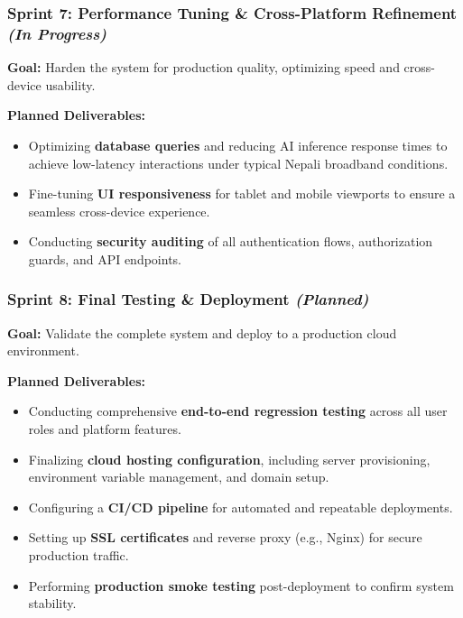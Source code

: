 \subsubsection*{Sprint 7: Performance Tuning \& Cross-Platform Refinement \hfill \textit{(In Progress)}}

\textbf{Goal:} Harden the system for production quality, optimizing speed and cross-device usability.

\textbf{Planned Deliverables:}
\begin{itemize}
    \item Optimizing \textbf{database queries} and reducing AI inference response times to achieve low-latency interactions under typical Nepali broadband conditions.
    \item Fine-tuning \textbf{UI responsiveness} for tablet and mobile viewports to ensure a seamless cross-device experience.
    \item Conducting \textbf{security auditing} of all authentication flows, authorization guards, and API endpoints.
\end{itemize}

\subsubsection*{Sprint 8: Final Testing \& Deployment \hfill \textit{(Planned)}}

\textbf{Goal:} Validate the complete system and deploy to a production cloud environment.

\textbf{Planned Deliverables:}
\begin{itemize}
    \item Conducting comprehensive \textbf{end-to-end regression testing} across all user roles and platform features.
    \item Finalizing \textbf{cloud hosting configuration}, including server provisioning, environment variable management, and domain setup.
    \item Configuring a \textbf{CI/CD pipeline} for automated and repeatable deployments.
    \item Setting up \textbf{SSL certificates} and reverse proxy (e.g., Nginx) for secure production traffic.
    \item Performing \textbf{production smoke testing} post-deployment to confirm system stability.
\end{itemize}

